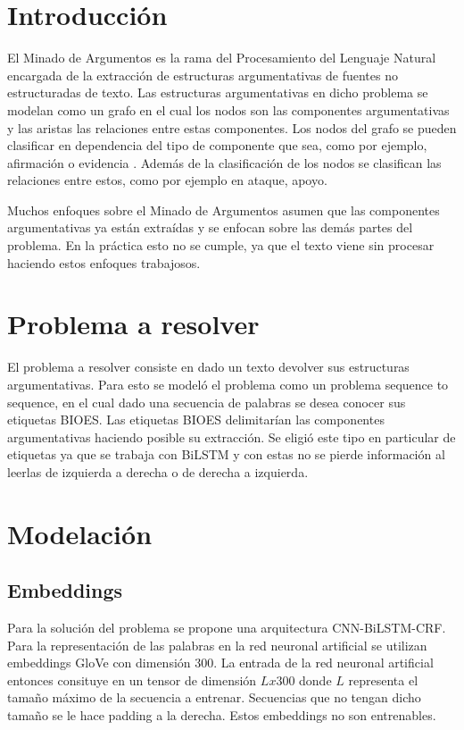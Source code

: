 \documentclass[runningheads]{llncs}
\begin{document}
\section{Introducción}

El Minado de Argumentos es la rama del Procesamiento del Lenguaje Natural encargada
de la extracción de estructuras argumentativas de fuentes no estructuradas de texto.
Las estructuras argumentativas en dicho problema se modelan como un grafo en el cual
los nodos son las componentes argumentativas y las aristas las relaciones entre estas
componentes. Los nodos del grafo se pueden clasificar en dependencia del tipo de componente
que sea, como por ejemplo, afirmación o evidencia . Además de la clasificación de los
nodos se clasifican las relaciones entre estos, como por ejemplo en ataque, apoyo.

Muchos enfoques sobre el Minado de Argumentos asumen que las componentes argumentativas ya
están extraídas y se enfocan sobre las demás partes del problema. En la práctica esto no se
cumple, ya que el texto viene sin procesar haciendo estos enfoques trabajosos. 

\section{Problema a resolver}

El problema a resolver consiste en dado un texto devolver sus estructuras argumentativas.
Para esto se modeló el problema como un problema sequence to sequence, en el cual dado una
secuencia de palabras se desea conocer sus etiquetas BIOES. Las etiquetas BIOES delimitarían
las componentes argumentativas haciendo posible su extracción. Se eligió este tipo en particular
de etiquetas ya que se trabaja con BiLSTM y con estas no se pierde información al leerlas de 
izquierda a derecha o de derecha a izquierda.

\section{Modelación}

\subsection{Embeddings}

Para la solución del problema se propone una arquitectura CNN-BiLSTM-CRF. Para la representación
de las palabras en la red neuronal artificial se utilizan embeddings GloVe con dimensión 300.
La entrada de la red neuronal artificial entonces consituye en un tensor de dimensión 
$Lx300$ donde $L$ representa el tamaño máximo de la secuencia a entrenar. Secuencias que
no tengan dicho tamaño se le hace padding a la derecha. Estos embeddings no son entrenables.
\end{document}
